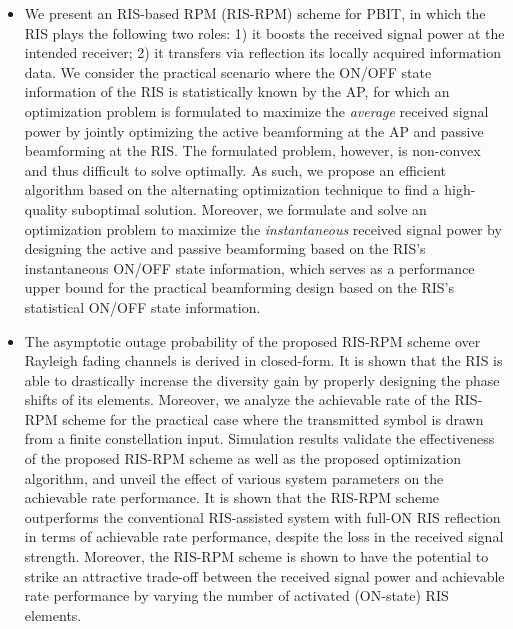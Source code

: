 \documentclass[draftclsnofoot,onecolumn,12pt]{IEEEtran}
\begin{document}
\begin{itemize}
\item 
We present an RIS-based RPM (RIS-RPM) scheme for PBIT, in which the RIS plays the following two roles: 1)  it boosts the received signal power at the intended receiver; 2) it transfers via reflection its locally acquired information data. 
We consider the practical scenario where the ON/OFF state information of the RIS is statistically known by the AP, for which an optimization problem is formulated to maximize the {\it average} received signal power by jointly optimizing the active beamforming at the AP and passive beamforming at the RIS. 
The formulated problem, however, is non-convex and thus difficult to solve optimally. 
As such, we propose an efficient algorithm based on the alternating optimization technique to find a high-quality suboptimal solution. 
Moreover, we formulate and solve an optimization problem to maximize the {\it instantaneous} received signal power by designing the active and passive beamforming based on the RIS's instantaneous ON/OFF state information, which serves as a performance upper bound for the practical beamforming design based on the RIS's statistical ON/OFF state information.

\item 
The asymptotic outage probability of the proposed RIS-RPM scheme over Rayleigh fading channels is derived  in closed-form.  
It is shown that 
the RIS is able to drastically increase the diversity gain by properly designing the phase shifts of its elements. 
Moreover, we analyze the achievable rate of the RIS-RPM scheme for the practical case where the transmitted symbol is drawn from a finite constellation input. 
Simulation results validate the effectiveness of the proposed  RIS-RPM scheme as well as the proposed optimization algorithm, and unveil the effect of various system parameters on the achievable rate performance. 
It is shown that the RIS-RPM scheme outperforms the conventional RIS-assisted system with full-ON RIS reflection \cite{Wu2018Intelligent} in terms of achievable rate performance, despite the loss in the received signal strength. 
Moreover, the RIS-RPM scheme is shown to have the potential to strike an attractive trade-off between the received signal power and achievable rate performance by varying the number of activated (ON-state) RIS elements.


\end{itemize}
\end{document}
